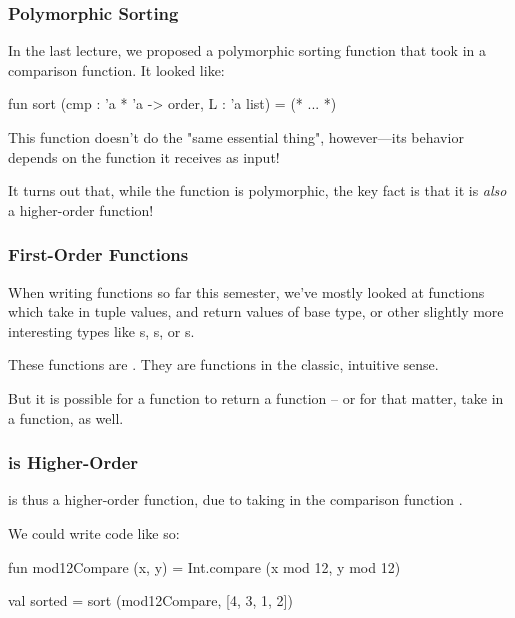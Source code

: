 \documentclass[aspectratio=169]{beamer}
\begin{document}
\begin{frame}[fragile]
  \frametitle{Polymorphic Sorting}

  In the last lecture, we proposed a polymorphic sorting function that took in a
  comparison function. It looked like:

  \pause
  \vspace{\fill}

  \begin{codeblock}
    fun sort (cmp : 'a * 'a -> order, L : 'a list) = (* ... *)
  \end{codeblock}

  \pause
  \vspace{\fill}

  This  function doesn't do the "same essential thing", however---its
  behavior depends on the  function it receives as input!

  \pause
  \vspace{\fill}

  It turns out that, while the  function is polymorphic, the key
  fact is that it is \textit{also} a higher-order function!
\end{frame}

\begin{frame}[fragile]
  \frametitle{First-Order Functions}

  When writing functions so far this semester, we've mostly looked at functions which take
  in tuple values, and return values of base type, or other slightly more interesting types
  like s, s, or s.

  \pause
  \vspace{\fill}

  These functions are . They are functions in the classic, intuitive sense.

  \pause
  \vspace{\fill}

  But it is possible for a function to return a function -- or for that matter, take in a
  function, as well.

  \pause
  \vspace{\fill}

\end{frame}

\begin{frame}[fragile]
  \frametitle{ is Higher-Order}

   is thus a higher-order function, due to taking in the comparison function
  .

  \pause
  \vspace{\fill}

  We could write code like so:

  \begin{codeblock}
    fun mod12Compare (x, y) = Int.compare (x mod 12, y mod 12)

    val sorted = sort (mod12Compare, [4, 3, 1, 2])
  \end{codeblock}
\end{frame}
\end{document}
